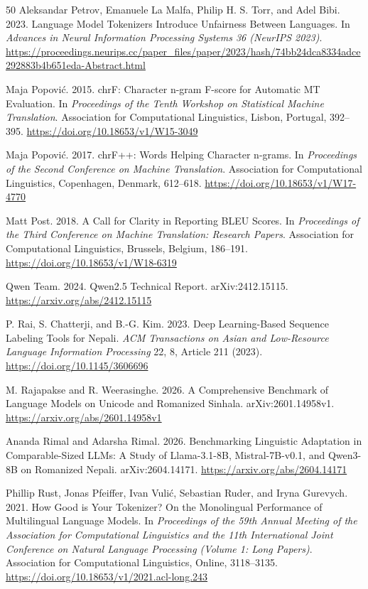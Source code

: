 \documentclass{article}
\begin{document}
\begin{thebibliography}{50}
Aleksandar Petrov, Emanuele La Malfa, Philip H. S. Torr, and Adel Bibi. 2023. Language Model Tokenizers Introduce Unfairness Between Languages. In \emph{Advances in Neural Information Processing Systems 36 (NeurIPS 2023)}. \url{https://proceedings.neurips.cc/paper_files/paper/2023/hash/74bb24dca8334adce292883b4b651eda-Abstract.html}

Maja Popović. 2015. chrF: Character n-gram F-score for Automatic MT Evaluation. In \emph{Proceedings of the Tenth Workshop on Statistical Machine Translation}. Association for Computational Linguistics, Lisbon, Portugal, 392–395. \url{https://doi.org/10.18653/v1/W15-3049}

Maja Popović. 2017. chrF++: Words Helping Character n-grams. In \emph{Proceedings of the Second Conference on Machine Translation}. Association for Computational Linguistics, Copenhagen, Denmark, 612–618. \url{https://doi.org/10.18653/v1/W17-4770}

Matt Post. 2018. A Call for Clarity in Reporting BLEU Scores. In \emph{Proceedings of the Third Conference on Machine Translation: Research Papers}. Association for Computational Linguistics, Brussels, Belgium, 186–191. \url{https://doi.org/10.18653/v1/W18-6319}

Qwen Team. 2024. Qwen2.5 Technical Report. arXiv:2412.15115. \url{https://arxiv.org/abs/2412.15115}

P. Rai, S. Chatterji, and B.-G. Kim. 2023. Deep Learning-Based Sequence Labeling Tools for Nepali. \emph{ACM Transactions on Asian and Low-Resource Language Information Processing} 22, 8, Article 211 (2023). \url{https://doi.org/10.1145/3606696}

M. Rajapakse and R. Weerasinghe. 2026. A Comprehensive Benchmark of Language Models on Unicode and Romanized Sinhala. arXiv:2601.14958v1. \url{https://arxiv.org/abs/2601.14958v1}

Ananda Rimal and Adarsha Rimal. 2026. Benchmarking Linguistic Adaptation in Comparable-Sized LLMs: A Study of Llama-3.1-8B, Mistral-7B-v0.1, and Qwen3-8B on Romanized Nepali. arXiv:2604.14171. \url{https://arxiv.org/abs/2604.14171}

Phillip Rust, Jonas Pfeiffer, Ivan Vulić, Sebastian Ruder, and Iryna Gurevych. 2021. How Good is Your Tokenizer? On the Monolingual Performance of Multilingual Language Models. In \emph{Proceedings of the 59th Annual Meeting of the Association for Computational Linguistics and the 11th International Joint Conference on Natural Language Processing (Volume 1: Long Papers)}. Association for Computational Linguistics, Online, 3118–3135. \url{https://doi.org/10.18653/v1/2021.acl-long.243}


\end{thebibliography}
\end{document}
